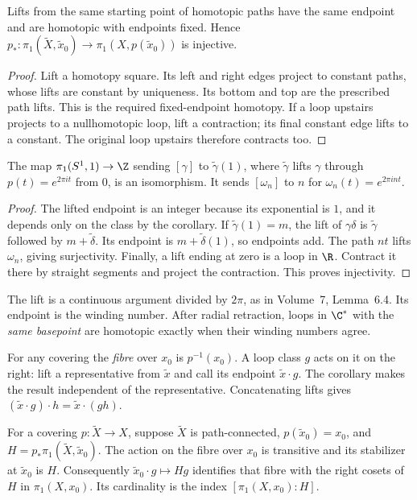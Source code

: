 \begin{corollary}\label{cor:liftendpoints}
Lifts from the same starting point of homotopic paths have the same endpoint and are homotopic with endpoints fixed. Hence $p_*:\pi_1(\tilde X,\tilde x_0)\to\pi_1(X,p(\tilde x_0))$ is injective.
\end{corollary}

\begin{proof}
Lift a homotopy square. Its left and right edges project to constant paths, whose lifts are constant by uniqueness. Its bottom and top are the prescribed path lifts. This is the required fixed-endpoint homotopy. If a loop upstairs projects to a nullhomotopic loop, lift a contraction; its final constant edge lifts to a constant. The original loop upstairs therefore contracts too.
\end{proof}

\begin{theorem}\label{thm:pi1circle}
The map $\pi_1(S^1,1)\to\Z$ sending $[\gamma]$ to $\tilde\gamma(1)$, where $\tilde\gamma$ lifts $\gamma$ through $p(t)=e^{2\pi it}$ from $0$, is an isomorphism. It sends $[\omega_n]$ to $n$ for $\omega_n(t)=e^{2\pi int}$.
\end{theorem}

\begin{proof}
The lifted endpoint is an integer because its exponential is $1$, and it depends only on the class by the corollary. If $\tilde\gamma(1)=m$, the lift of $\gamma\delta$ is $\tilde\gamma$ followed by $m+\tilde\delta$. Its endpoint is $m+\tilde\delta(1)$, so endpoints add. The path $nt$ lifts $\omega_n$, giving surjectivity. Finally, a lift ending at zero is a loop in $\R$. Contract it there by straight segments and project the contraction. This proves injectivity.
\end{proof}

The lift is a continuous argument divided by $2\pi$, as in Volume~7, Lemma~6.4. Its endpoint is the winding number. After radial retraction, loops in $\C^*$ with the \emph{same basepoint} are homotopic exactly when their winding numbers agree.

For any covering the \emph{fibre} over $x_0$ is $p^{-1}(x_0)$. A loop class $g$ acts on it on the right: lift a representative from $\tilde x$ and call its endpoint $\tilde x\cdot g$. The corollary makes the result independent of the representative. Concatenating lifts gives $(\tilde x\cdot g)\cdot h=\tilde x\cdot(gh)$.

\begin{proposition}\label{prop:fibre}
For a covering $p:\tilde X\to X$, suppose $\tilde X$ is path-connected, $p(\tilde x_0)=x_0$, and $H=p_*\pi_1(\tilde X,\tilde x_0)$. The action on the fibre over $x_0$ is transitive and its stabilizer at $\tilde x_0$ is $H$. Consequently $\tilde x_0\cdot g\mapsto Hg$ identifies that fibre with the right cosets of $H$ in $\pi_1(X,x_0)$. Its cardinality is the index $[\pi_1(X,x_0):H]$.
\end{proposition}

